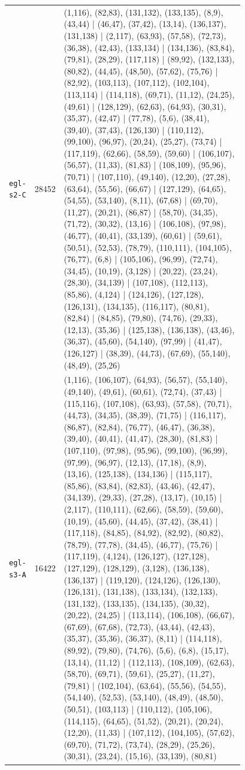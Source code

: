 \begin{landscape}
\begin{longtable}{lr>{\tiny\raggedright\arraybackslash}p{0.78\linewidth}}
\texttt{egl-s2-C} & 28452 & (1,116), (82,83), (131,132), (133,135), (8,9), (43,44) | (46,47), (37,42), (13,14), (136,137), (131,138) | (2,117), (63,93), (57,58), (72,73), (36,38), (42,43), (133,134) | (134,136), (83,84), (79,81), (28,29), (117,118) | (89,92), (132,133), (80,82), (44,45), (48,50), (57,62), (75,76) | (82,92), (103,113), (107,112), (102,104), (113,114) | (114,118), (69,71), (11,12), (24,25), (49,61) | (128,129), (62,63), (64,93), (30,31), (35,37), (42,47) | (77,78), (5,6), (38,41), (39,40), (37,43), (126,130) | (110,112), (99,100), (96,97), (20,24), (25,27), (73,74) | (117,119), (62,66), (58,59), (59,60) | (106,107), (56,57), (11,33), (81,83) | (108,109), (95,96), (70,71) | (107,110), (49,140), (12,20), (27,28), (63,64), (55,56), (66,67) | (127,129), (64,65), (54,55), (53,140), (8,11), (67,68) | (69,70), (11,27), (20,21), (86,87) | (58,70), (34,35), (71,72), (30,32), (13,16) | (106,108), (97,98), (46,77), (40,41), (33,139), (60,61) | (59,61), (50,51), (52,53), (78,79), (110,111), (104,105), (76,77), (6,8) | (105,106), (96,99), (72,74), (34,45), (10,19), (3,128) | (20,22), (23,24), (28,30), (34,139) | (107,108), (112,113), (85,86), (4,124) | (124,126), (127,128), (126,131), (134,135), (116,117), (80,81), (82,84) | (84,85), (79,80), (74,76), (29,33), (12,13), (35,36) | (125,138), (136,138), (43,46), (36,37), (45,60), (54,140), (97,99) | (41,47), (126,127) | (38,39), (44,73), (67,69), (55,140), (48,49), (25,26) \\[2pt]
\texttt{egl-s3-A} & 16422 & (1,116), (106,107), (64,93), (56,57), (55,140), (49,140), (49,61), (60,61), (72,74), (37,43) | (115,116), (107,108), (63,93), (57,58), (70,71), (44,73), (34,35), (38,39), (71,75) | (116,117), (86,87), (82,84), (76,77), (46,47), (36,38), (39,40), (40,41), (41,47), (28,30), (81,83) | (107,110), (97,98), (95,96), (99,100), (96,99), (97,99), (96,97), (12,13), (17,18), (8,9), (13,16), (125,138), (134,136) | (115,117), (85,86), (83,84), (82,83), (43,46), (42,47), (34,139), (29,33), (27,28), (13,17), (10,15) | (2,117), (110,111), (62,66), (58,59), (59,60), (10,19), (45,60), (44,45), (37,42), (38,41) | (117,118), (84,85), (84,92), (82,92), (80,82), (78,79), (77,78), (34,45), (46,77), (75,76) | (117,119), (4,124), (126,127), (127,128), (127,129), (128,129), (3,128), (136,138), (136,137) | (119,120), (124,126), (126,130), (126,131), (131,138), (133,134), (132,133), (131,132), (133,135), (134,135), (30,32), (20,22), (24,25) | (113,114), (106,108), (66,67), (67,69), (67,68), (72,73), (43,44), (42,43), (35,37), (35,36), (36,37), (8,11) | (114,118), (89,92), (79,80), (74,76), (5,6), (6,8), (15,17), (13,14), (11,12) | (112,113), (108,109), (62,63), (58,70), (69,71), (59,61), (25,27), (11,27), (79,81) | (102,104), (63,64), (55,56), (54,55), (54,140), (52,53), (53,140), (48,49), (48,50), (50,51), (103,113) | (110,112), (105,106), (114,115), (64,65), (51,52), (20,21), (20,24), (12,20), (11,33) | (107,112), (104,105), (57,62), (69,70), (71,72), (73,74), (28,29), (25,26), (30,31), (23,24), (15,16), (33,139), (80,81) \\[2pt]

\end{longtable}
\end{landscape}
